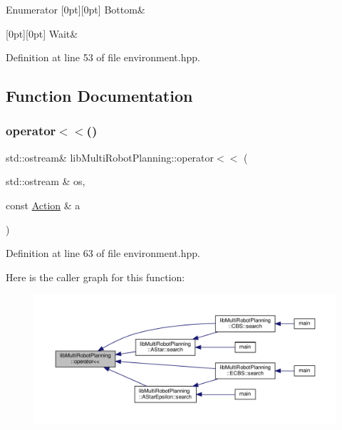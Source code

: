 \begin{DoxyEnumFields}{Enumerator}
[0pt][0pt]{}\mbox{\label{namespacelib_multi_robot_planning_aba73fb71693f86a324adfa0e41e1053da2ad9d63b69c4a10a5cc9cad923133bc4}} 
Bottom&\\
\hline

[0pt][0pt]{}\mbox{\label{namespacelib_multi_robot_planning_aba73fb71693f86a324adfa0e41e1053da0f68101772bd5397ef8eb1b632798652}} 
Wait&\\
\hline

\end{DoxyEnumFields}


Definition at line 53 of file environment.\+hpp.



\subsection{Function Documentation}
\mbox{\label{namespacelib_multi_robot_planning_ac64bacf3115f1341bd7ce739c119f00a}} 
\subsubsection{\texorpdfstring{operator$<$$<$()}{operator<<()}}
{\footnotesize\ttfamily std\+::ostream\& lib\+Multi\+Robot\+Planning\+::operator$<$$<$ (\begin{DoxyParamCaption}\item[{std\+::ostream \&}]{os,  }\item[{const \hyperlink{namespacelib_multi_robot_planning_aba73fb71693f86a324adfa0e41e1053d}{Action} \&}]{a }\end{DoxyParamCaption})}



Definition at line 63 of file environment.\+hpp.

Here is the caller graph for this function\+:
\nopagebreak
\begin{figure}[H]
\begin{center}
\leavevmode
\includegraphics[width=350pt]{namespacelib_multi_robot_planning_ac64bacf3115f1341bd7ce739c119f00a_icgraph}
\end{center}
\end{figure}
